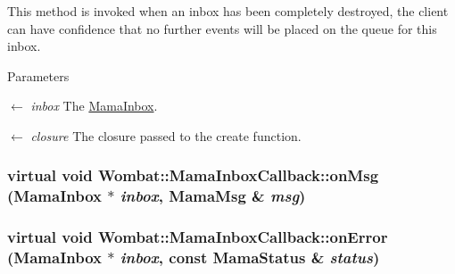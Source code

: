 This method is invoked when an inbox has been completely destroyed, the client can have confidence that no further events will be placed on the queue for this inbox. 
\begin{DoxyParams}{Parameters}
\item[\mbox{$\leftarrow$} {\em inbox}]The \hyperlink{classWombat_1_1MamaInbox}{MamaInbox}. \item[\mbox{$\leftarrow$} {\em closure}]The closure passed to the create function. \end{DoxyParams}
\hypertarget{classWombat_1_1MamaInboxCallback_aba5c3925173822c110bc32bf564acdd3}{
\subsubsection[{onMsg}]{\setlength{\rightskip}{0pt plus 5cm}virtual void Wombat::MamaInboxCallback::onMsg ({\bf MamaInbox} $\ast$ {\em inbox}, \/  {\bf MamaMsg} \& {\em msg})}}
\label{classWombat_1_1MamaInboxCallback_aba5c3925173822c110bc32bf564acdd3}
\hypertarget{classWombat_1_1MamaInboxCallback_a4b932f6ae51dea6a919a6058f1f52ae9}{
\subsubsection[{onError}]{\setlength{\rightskip}{0pt plus 5cm}virtual void Wombat::MamaInboxCallback::onError ({\bf MamaInbox} $\ast$ {\em inbox}, \/  const {\bf MamaStatus} \& {\em status})}}
\label{classWombat_1_1MamaInboxCallback_a4b932f6ae51dea6a919a6058f1f52ae9}
